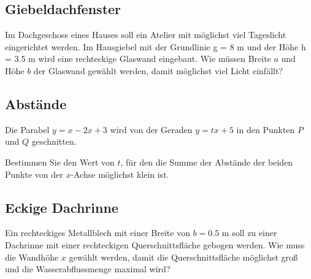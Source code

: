 

\subsection{Giebeldachfenster}

Im Dachgeschoss eines Hauses soll ein Atelier
mit möglichst viel Tageslicht eingerichtet
werden. Im Hausgiebel mit der Grundlinie
g = 8 m und der Höhe h = 3.5 m wird eine
rechteckige Glaswand eingebaut. Wie müssen
Breite $a$ und Höhe $b$ der Glaswand gewählt
werden, damit möglichst viel Licht einfällt?




\subsection{Abstände}
Die Parabel $y = x - 2x + 3$ wird von der Geraden $y = tx + 5$ in den
Punkten $P$ und $Q$ geschnitten.

Bestimmen Sie den Wert von $t$, für den die Summe der Abstände der beiden Punkte
von der $x$-Achse möglichst klein ist.



\subsection{Eckige Dachrinne}
Ein rechteckiges Metallblech mit einer Breite
von $b = 0.5 \text{ m}$ soll zu einer Dachrinne mit einer
rechteckigen Querschnittsfläche gebogen werden.
Wie muss die Wandhöhe $x$ gewählt werden, damit
die Querschnittsfläche möglichst groß und die
Wasserabflussmenge maximal wird?


